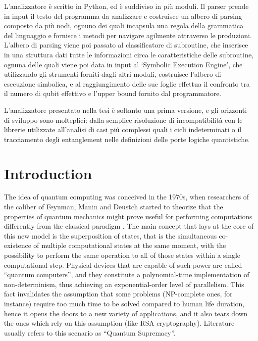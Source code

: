 \documentclass[12pt,a4paper]{report}
\theoremstyle{definition}
\theoremstyle{definition}
\theoremstyle{definition}
\begin{document}
L'analizzatore è scritto in Python, ed è suddiviso in più moduli. Il parser prende in input il testo del programma da analizzare e costruisce un albero di parsing composto da più nodi, ognuno dei quali incapsula una regola della grammatica del linguaggio e fornisce i metodi per navigare agilmente attraverso le produzioni. L'albero di parsing viene poi passato al classificatore di subroutine, che inserisce in una struttura dati tutte le informazioni circa le caratteristiche delle subroutine, ognuna delle quali viene poi data in input al `Symbolic Execution Engine', che utilizzando gli strumenti forniti dagli altri moduli, costruisce l'albero di esecuzione simbolica, e al raggiungimento delle sue foglie effettua il confronto tra il numero di qubit effettivo e l'upper bound fornito dal programmatore.

L'analizzatore presentato nella tesi è soltanto una prima versione, e gli orizzonti di sviluppo sono molteplici: dalla semplice risoluzione di incompatibilità con le librerie utilizzate all'analisi di casi più complessi quali i cicli indeterminati o il tracciamento degli entanglement nelle definizioni delle porte logiche quantistiche.




\tableofcontents



\chapter{Introduction}
\par The idea of quantum computing was conceived in the 1970s, when researchers of the caliber of Feynman, Manin and Deustch started to theorize that the properties of quantum mechanics might prove useful for performing computations differently from the classical paradigm \cite{zuw}. The main concept that lays at the core of this new model is the superposition of states, that is the simultaneous co-existence of multiple computational states at the same moment, with the possibility to perform the same operation to all of those states within a single computational step. Physical devices that are capable of such power are called ``quantum computers'', and they constitute a polynomial-time implementation of non-determinism, thus achieving an exponential-order level of parallelism. This fact invalidates the assumption that some problems (NP-complete ones, for instance) require too much time to be solved compared to human life duration, hence it opens the doors to a new variety of applications, and it also tears down the ones which rely on this assumption (like RSA cryptography). Literature usually refers to this scenario as ``Quantum Supremacy''.
\end{document}
